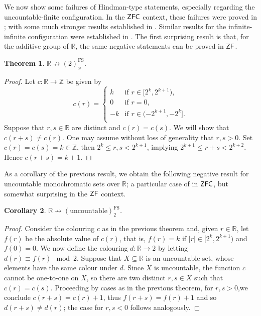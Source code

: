 \documentclass[10pt,a4paper]{amsart}
\newtheorem{theorem}{Theorem}[section]
\newtheorem{corollary}[theorem]{Corollary}
\theoremstyle{definition}
\newcommand{\zf}{\mathnormal{\mathsf{ZF}}}
\newcommand{\zfc}{\mathnormal{\mathsf{ZFC}}}
\theoremstyle{remark}
\numberwithin{equation}{section}
\begin{document}
We now show some failures of Hindman-type statements, especially regarding the uncountable-finite configuration. In the $\zfc$ context, these failures were proved in \cite{Fernandez2018}; with some much stronger results established in \cite{FernandezRinot2017}. Similar results for the infinite-infinite configuration were established in \cite[Theorem 12]{FernandezLee2020}. The first surprising result is that, for the additive group of  $\mathbb R$, the same negative statements can be proved in $\zf$.

\begin{theorem}\label{thm:hindman-R-fails}
$\mathbb{R}\not\to(2)^{\operatorname{FS}}_{\omega}$.
\end{theorem}

    \begin{proof}
        Let $c:\mathbb{R}\longrightarrow\mathbb{Z}$ be given by
        \begin{equation*}
            c(r)=\begin{cases}
                k&\text{if }r\in[2^{k},2^{k+1}),\\
                0&\text{if }r=0,\\
                -k&\text{if }r\in(-2^{k+1},-2^{k}].\\
            \end{cases}
        \end{equation*}
        Suppose that $r,s\in\mathbb{R}$ are distinct and $c(r)=c(s)$. We will show that $c(r+s)\neq c(r)$. One may assume without loss of generality that $r,s>0$. Set $c(r)=c(s)=k\in\mathbb{Z}$, then $2^{k}\leq r,s<2^{k+1}$, implying $2^{k+1}\leq r+s<2^{k+2}$. Hence $c(r+s)=k+1$.
    \end{proof}

As a corollary of the previous result, we obtain the following negative result for uncountable monochromatic sets over $\mathbb R$; a particular case of \cite[Theorem 5]{Fernandez2018} in $\zfc$, but somewhat surprising in the $\zf$ context.

\begin{corollary}\label{hindman-on-R-is-countable}    $\mathbb{R}\not\to(\mathrm{uncountable})^{\operatorname{FS}}_{2}$.
\end{corollary}

\begin{proof}
    Consider the colouring $c$ as in the previous theorem and, given $r\in\mathbb R$, let $f(r)$ be the absolute value of $c(r)$, that is, $f(r)=k$ if $|r|\in[2^{k},2^{k+1})$ and $f(0)=0$. We now define the colouring $d:\mathbb R\longrightarrow 2$ by letting $d(r)\equiv f(r)\mod 2$. Suppose that $X\subseteq\mathbb R$ is an uncountable set, whose elements have the same colour under $d$. Since $X$ is uncountable, the  function $c$ cannot be one-to-one on $X$, so there are two distinct $r,s\in X$ such that $c(r)=c(s)$. Proceeding by cases as in the previous theorem, for $r,s>0$,\linebreak we conclude $c(r+s)=c(r)+1$, thus $f(r+s)=f(r)+1$ and so $d(r+s)\neq d(r)$; the case for $r,s<0$ follows analogously.
\end{proof}
\end{document}
